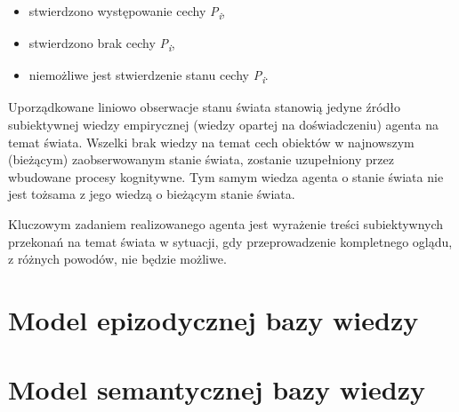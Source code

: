 		\begin{itemize}
		 	\setlength{\itemindent}{.5in}
			\item stwierdzono występowanie cechy \textit{P\textsubscript{i}},
			\item stwierdzono brak cechy \textit{P\textsubscript{i}},
			\item niemożliwe jest stwierdzenie stanu cechy \textit{P\textsubscript{i}}.
		\end{itemize}
	
	Uporządkowane liniowo obserwacje stanu świata stanowią jedyne źródło subiektywnej wiedzy empirycznej (wiedzy opartej na doświadczeniu) agenta na temat świata. Wszelki brak wiedzy na temat cech obiektów w najnowszym (bieżącym) zaobserwowanym stanie świata, zostanie uzupełniony przez wbudowane procesy kognitywne. Tym samym wiedza agenta o stanie świata nie jest tożsama z jego wiedzą o bieżącym stanie świata.
	
	Kluczowym zadaniem realizowanego agenta jest wyrażenie treści subiektywnych przekonań na temat świata w sytuacji, gdy przeprowadzenie kompletnego oglądu, z różnych powodów, nie będzie możliwe.
	

\section{Model epizodycznej bazy wiedzy}

\section{Model semantycznej bazy wiedzy}






